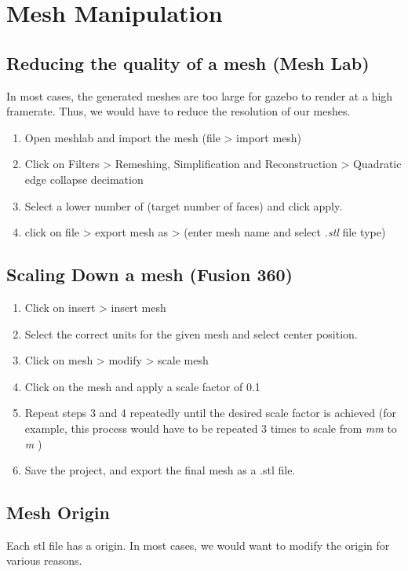 \documentclass[11pt]{article}
\begin{document}

\section{Mesh Manipulation}
\subsection{Reducing the quality of a mesh (Mesh Lab)}
In most cases, the generated meshes are too large for gazebo to render at a high framerate. Thus, we would have to reduce the resolution of our meshes.
\begin{enumerate}
 \item {
       Open meshlab and import the mesh (file > import mesh)
       }
 \item{
       Click on Filters > Remeshing, Simplification and Reconstruction >  Quadratic edge collapse decimation
       }
 \item{
       Select a lower number of (target number of faces) and click apply.
       }
 \item{
       click on file > export mesh as > (enter mesh name and select \emph{.stl} file type)
       }
\end{enumerate}
\subsection{Scaling Down a mesh (Fusion 360) }
\begin{enumerate}
 \item {
       Click on insert > insert mesh
       }
 \item {
       Select the correct units for the given mesh and select center position.
       }
 \item {
       Click on mesh > modify > scale mesh
       }
 \item {
       Click on the mesh and apply a scale factor of 0.1
       }
 \item {
       Repeat steps 3 and 4 repeatedly until the desired scale factor is achieved (for example, this process would have to be repeated 3 times to scale from \emph{mm} to \emph{m} )
       }
 \item{
       Save the project, and export the final mesh as a .stl file.
       }
\end{enumerate}

\subsection{Mesh Origin}
Each stl file has a origin. In most cases, we would want to modify the origin for various reasons.
\end{document}
